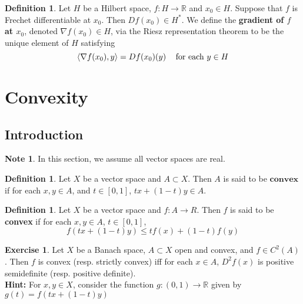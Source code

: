 \documentclass[12pt]{amsart}
\theoremstyle{definition}
\newtheorem{defn}[definition]{Definition}
\newtheorem{note}[definition]{Note}
\newtheorem{ex}[definition]{Exercise}
\newcommand{\R}{\mathbb{R}}
\newcommand{\ui}{[0,1]}
\renewcommand{\r}{\rangle}
\renewcommand{\l}{\langle}
\begin{document}
	\begin{defn}
	Let $H$ be a Hilbert space, $f: H \rightarrow \R$ and $x_0 \in H$. Suppose that $f$ is Frechet differentiable at $x_0$. Then $Df(x_0) \in H^*$. We define the \textbf{gradient of $f$ at $x_0$}, denoted $\nabla f(x_0) \in H$, via the Riesz representation theorem to be the unique element of $H$ satisfying $$\l \nabla f(x_0), y \r = Df(x_0)(y) \hspace{.3cm} \text{ for each } y \in H$$
	\end{defn}
	
	
	
	
	
	
	
	
	
	
	

	
	
	
	
	
	
	\newpage
	\section{Convexity}
	
	\subsection{Introduction}

	\begin{note}
	In this section, we assume all vector spaces are real.
	\end{note}

	\begin{defn}
	Let $X$ be a vector space and $A \subset X$. Then $A$ is said to be $\textbf{convex}$ if for each $x, y \in A$, and $t \in [0,1]$,  $tx + (1-t)y \in A$. 
	\end{defn}	
	
	\begin{defn}
	Let $X$ be a vector space and $f:A \rightarrow R$. Then $f$ is said to be \textbf{convex} if for each $x,y \in A$, $t \in \ui$, $$f(tx + (1-t)y) \leq tf(x) + (1-t)f(y)$$
	\end{defn}
		
	\begin{ex}
	Let $X$ be a Banach space, $A \subset X$ open and convex, and $f \in C^2(A)$. Then $f$ is convex (resp. strictly convex) iff for each $x \in A$, $D^2f(x)$ is positive semidefinite (resp. positive definite).\\
	\textbf{Hint:} For $x,y \in X$, consider the function $g:(0,1) \rightarrow \R$ given by  $g(t) = f(tx + (1-t)y)$
	\end{ex}
	
\end{document}
